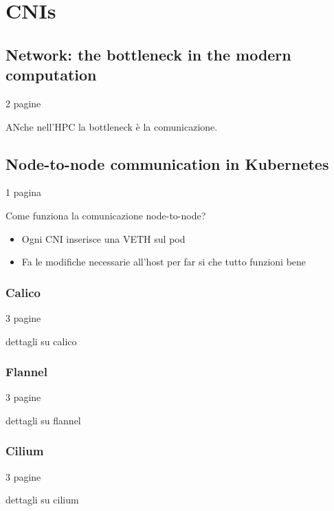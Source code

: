 \chapter{CNIs}\label{chpt:cni}



\section{Network: the bottleneck in the modern computation}\label{sec:network}

2 pagine


ANche nell'HPC la bottleneck è la comunicazione.

\section{Node-to-node communication in Kubernetes}\label{sec:node2node}
1 pagina

Come funziona la comunicazione node-to-node?

\begin{itemize}
    \item Ogni CNI inserisce una VETH sul pod
    \item Fa le modifiche necessarie all'host per far si che tutto funzioni bene
\end{itemize}



\subsection{Calico}\label{subsec:calico}
3 pagine

dettagli su calico

\subsection{Flannel}\label{subsec:flannel}
3 pagine

dettagli su flannel

\subsection{Cilium}\label{subsec:cilium}
3 pagine

dettagli su cilium
